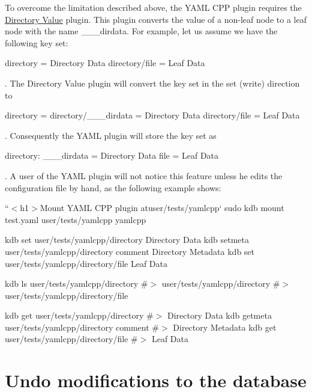 To overcome the limitation described above, the Y\+A\+ML C\+PP plugin requires the \hyperlink{md_src_plugins_directoryvalue_README_src_plugins_directoryvalue_README_md}{Directory Value} plugin. This plugin converts the value of a non-\/leaf node to a leaf node with the name {\ttfamily \+\_\+\+\_\+\+\_\+dirdata}. For example, let us assume we have the following key set\+:


\begin{DoxyCode}
directory      = Directory Data
directory/file = Leaf Data
\end{DoxyCode}


. The Directory Value plugin will convert the key set in the set (write) direction to


\begin{DoxyCode}
directory            =
directory/\_\_\_dirdata = Directory Data
directory/file       = Leaf Data
\end{DoxyCode}


. Consequently the Y\+A\+ML plugin will store the key set as


\begin{DoxyCode}
directory:
  \_\_\_dirdata = Directory Data
  file       = Leaf Data
\end{DoxyCode}


. A user of the Y\+A\+ML plugin will not notice this feature unless he edits the configuration file by hand, as the following example shows\+:

``{\ttfamily  $<$h1$>$Mount Y\+A\+ML C\+PP plugin at}user/tests/yamlcpp` sudo kdb mount test.\+yaml user/tests/yamlcpp yamlcpp

kdb set user/tests/yamlcpp/directory \textquotesingle{}Directory Data\textquotesingle{} kdb setmeta user/tests/yamlcpp/directory comment \textquotesingle{}Directory Metadata\textquotesingle{} kdb set user/tests/yamlcpp/directory/file \textquotesingle{}Leaf Data\textquotesingle{}

kdb ls user/tests/yamlcpp/directory \#$>$ user/tests/yamlcpp/directory \#$>$ user/tests/yamlcpp/directory/file

kdb get user/tests/yamlcpp/directory \#$>$ Directory Data kdb getmeta user/tests/yamlcpp/directory comment \#$>$ Directory Metadata kdb get user/tests/yamlcpp/directory/file \#$>$ Leaf Data

\section*{Undo modifications to the database}

